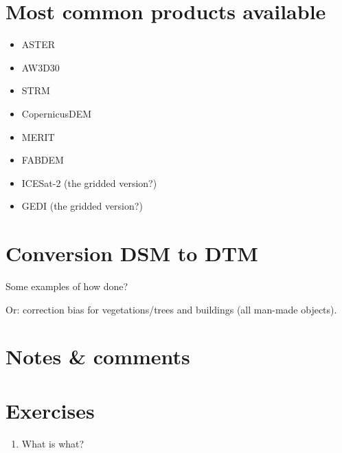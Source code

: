 %
\section[Most common products]{Most common products available}

\begin{itemize}
  \item ASTER
  \item AW3D30
  \item STRM
  \item CopernicusDEM
  \item MERIT
  \item FABDEM
  \item ICESat-2 (the gridded version?)
  \item GEDI (the gridded version?)
\end{itemize}


%
\section{Conversion DSM to DTM}

Some examples of how done?

Or: correction bias for vegetations/trees and buildings (all man-made objects).

%
\section{Notes \& comments}


%
\section{Exercises}

\begin{enumerate}
  \item What is what?
\end{enumerate}
